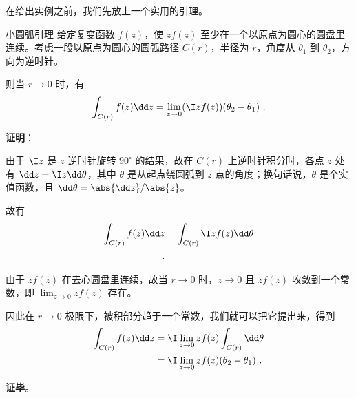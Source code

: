 在给出实例之前，我们先放上一个实用的引理。

\begin{lemma}{小圆弧引理}\label{lem_JdLem_1}
给定复变函数 $f(z)$，使 $zf(z)$ 至少在一个以原点为圆心的圆盘里连续。考虑一段以原点为圆心的圆弧路径 $C(r)$，半径为 $r$，角度从 $\theta_1$ 到 $\theta_2$，方向为逆时针。

则当 $r\to 0$ 时，有
\begin{equation}
\int_{C(r)}f(z)\dd z=\lim\limits_{z\to 0}(\I zf(z))(\theta_2-\theta_1)~.
\end{equation}

\end{lemma}


\textbf{证明}：

由于 $\I z$ 是 $z$ 逆时针旋转 $90^\circ$ 的结果，故在 $C(r)$ 上逆时针积分时，各点 $z$ 处有 $\dd z=\I z\dd \theta$，其中 $\theta$ 是从起点绕圆弧到 $z$ 点的角度；换句话说，$\theta$ 是个实值函数，且 $\dd \theta=\abs{\dd z}/\abs{z}$。


故有
\begin{equation}
\begin{aligned}
\int_{C(r)}f(z)\dd z&=\int_{C(r)}\I zf(z)\dd \theta\\~.
\end{aligned}
\end{equation}

由于 $zf(z)$ 在去心圆盘里连续，故当 $r\to 0$ 时，$z\to 0$ 且 $zf(z)$ 收敛到一个常数，即 $\lim_{z\to 0}zf(z)$ 存在。

因此在 $r\to 0$ 极限下，被积部分趋于一个常数，我们就可以把它提出来，得到
\begin{equation}
\begin{aligned}
\int_{C(r)}f(z)\dd z&=\I \lim_{z\to 0}zf(z)\int_{C(r)}\dd \theta\\
&=\I \lim_{z\to 0}zf(z)(\theta_2-\theta_1)~.
\end{aligned}
\end{equation}

\textbf{证毕}。











